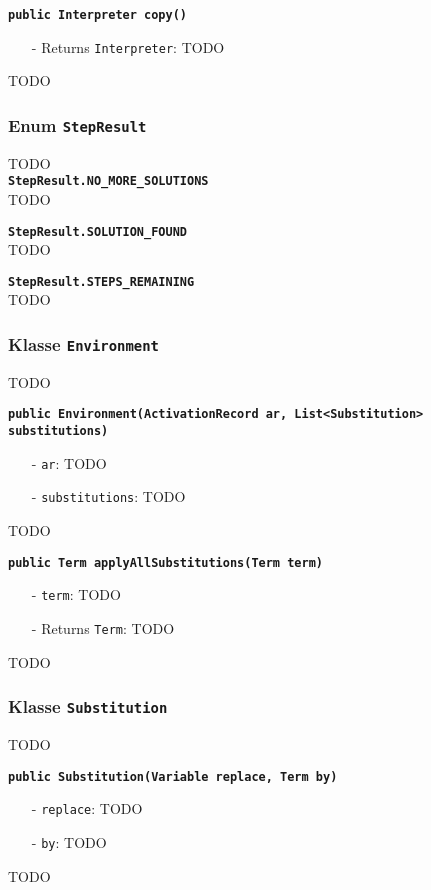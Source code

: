 \documentclass[parskip=full,11pt,twoside]{scrartcl}
\begin{document}
\textbf{\texttt{public Interpreter copy()}}
\begin{itemize}[noitemsep]
	\item[-] Returns \texttt{Interpreter}: TODO
\end{itemize}
TODO

\subsubsection{Enum \texttt{StepResult}}
TODO\\

\textbf{\texttt{StepResult.NO\_MORE\_SOLUTIONS}}\\
TODO

\textbf{\texttt{StepResult.SOLUTION\_FOUND}}\\
TODO

\textbf{\texttt{StepResult.STEPS\_REMAINING}}\\
TODO

\subsubsection{Klasse \texttt{Environment}}
TODO

\textbf{\texttt{public Environment(ActivationRecord ar, List<Substitution>\\ substitutions)}}
\begin{itemize}[noitemsep]
	\item[-] \texttt{ar}: TODO
	\item[-] \texttt{substitutions}: TODO
\end{itemize}
TODO

\textbf{\texttt{public Term applyAllSubstitutions(Term term)}}
\begin{itemize}[noitemsep]
	\item[-] \texttt{term}: TODO
	\item[-] Returns \texttt{Term}: TODO
\end{itemize}
TODO

\subsubsection{Klasse \texttt{Substitution}}
TODO

\textbf{\texttt{public Substitution(Variable replace, Term by)}}
\begin{itemize}[noitemsep]
	\item[-] \texttt{replace}: TODO
	\item[-] \texttt{by}: TODO
\end{itemize}
TODO
\end{document}
